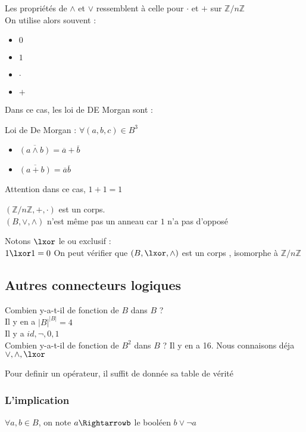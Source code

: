 Les propriétés de $\land$ et $\lor$ ressemblent à celle pour $\cdot$ et $+$ sur $\mathbb{Z}/n\mathbb{Z}$ \\

On utilise alors souvent : 
\begin{itemize}
    \item $0$
    \item $1$
    \item $\cdot$
    \item $+$
\end{itemize}

Dans ce cas, les loi de DE Morgan sont :
\item Loi de De Morgan : $\forall (a,b,c) \in B^3$
\begin{itemize}
    \item $\overline{(a\land b)}= \overline a + \overline b$
    \item $\overline{(a + b)}= \overline a  \overline b$
\end{itemize}

Attention dans ce cas, $1+1=1$

\begin{rq}
    $(\mathbb{Z}/n\mathbb{Z},+,\cdot)$ est un corps. \\
    $(B,\lor,\land)$ n'est même pas un anneau car $1$ n'a pas d'opposé
\end{rq}

\begin{rq}
    Notons $\lxor$ le ou exclusif : \\
    $1\lxor 1=0$
    On peut vérifier que $(B,\lxor,\land)$ est un corps , isomorphe à $\mathbb{Z}/n\mathbb{Z}$
\end{rq}

\subsection{Autres connecteurs logiques}
Combien y-a-t-il de fonction de $B$ dans $B$ ? \\
Il y en a $|B|^{|B|}=4$ \\
Il y a $id,\lnot,0,1$ \\

Combien y-a-t-il de fonction de $B^2$ dans $B$ ?
Il y en a 16. Nous connaisons déja $\lor,\land,\lxor$

Pour definir un opérateur, il suffit de donnée sa table de vérité

\subsubsection{L'implication}
\begin{def}
    $\forall a,b \in B$, on note $a\Rightarrowb$ le booléen $b\lor\lnot a$
\end{def}


